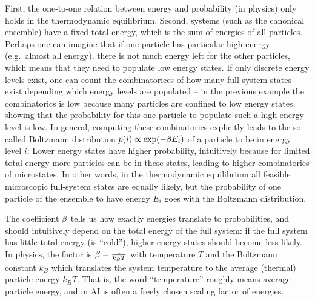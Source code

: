 First, the one-to-one relation between energy and probability (in
physics) only holds in the thermodynamic
equilibrium. Second, systems (such as the canonical ensemble) have a
fixed total energy, which is the sum of energies of all
particles. Perhaps one can imagine that if one particle has particular
high energy (e.g.\ almost all energy), there is not much energy left
for the other particles, which means that they need to populate low
energy states. If only discrete energy levels exist, one can
count the combinatorices of how many full-system states exist depending which energy levels
are populated -- in the previous example the combinatorics is low
because many particles are confined to low energy states, showing that
the probability for this one particle to populate such a high energy
level is low. In general,
computing these combinatorics explicitly leads to the so-called
Boltzmann distribution $p(i) \propto \exp(-\beta E_i)$ of a particle to
be in energy level $i$: Lower energy states have higher probability,
intuitively because for limited total energy more particles can be in these
states, leading to higher combinatorics of microstates. In other
words, in the thermodynamic equilibrium all feasible microscopic
full-system states are equally likely, but the probability of one
particle of the ensemble to have energy $E_i$ goes with the Boltzmann
distribution.

The coefficient $\beta$ tells us how exactly energies
translate to probabilities, and should intuitively depend on the total
energy of the full system: if the full system has little total energy
(is ``cold''), higher energy states should become less likely. In
physics, the factor is $\beta=\textstyle\frac{1}{k_B T}$ with temperature $T$ and
the Boltzmann constant $k_B$ which translates the system temperature
to the average (thermal) particle energy $k_B T$. That is,
the word ``temperature'' roughly means average particle energy, and in
AI is often a freely chosen scaling factor of energies.



